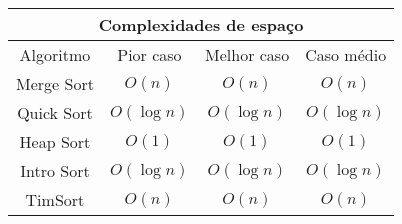 \begin{center}
\begin{tabular}{||c|c|c|c||}
\hline
\multicolumn{4}{|c|}{Complexidades de espaço} \\\hline
Algoritmo & Pior caso & Melhor caso & Caso médio\\
\hline
Merge Sort & $O(n)$      & $O(n)$      & $O(n)$ \\
Quick Sort & $O(\log n)$ & $O(\log n)$ & $O(\log n)$ \\
Heap Sort  & $O(1)$      & $O(1)$      & $O(1)$ \\
Intro Sort & $O(\log n)$ & $O(\log n)$ & $O(\log n)$ \\
TimSort    & $O(n)$      & $O(n)$      & $O(n)$ \\\hline
\end{tabular}
\end{center}
